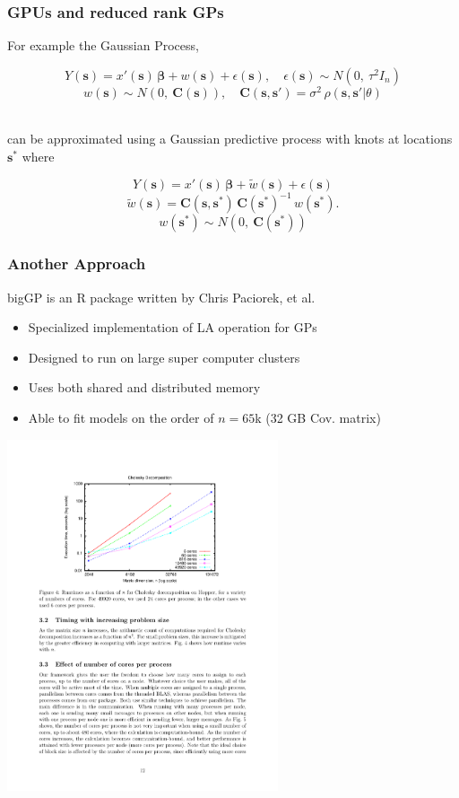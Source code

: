 \documentclass[t]{beamer}\usepackage[]{graphicx}\usepackage[]{color}
\begin{document}
\begin{frame}
\frametitle{GPUs and reduced rank GPs}
    
For example the Gaussian Process,

\[ Y(\bm{s}) = x'(\bm{s}) \, \bm{\beta} + w(\bm{s}) + \epsilon(\bm{s}), \quad \epsilon(\bm{s}) \sim N(0,~\tau^2I_n) \]
%
\[ w(\bm{s}) \sim N(0,~\bm{C}(\bm{s})), \quad \bm{C}(\bm{s},\bm{s}')=\sigma^2\,\rho(\bm{s},\bm{s}'|\theta) \]

~\\

can be approximated using a Gaussian predictive process with knots at locations $\bm{s}^*$ where

\[ Y(\bm{s}) = x'(\bm{s}) \, \bm{\beta} + \widetilde{w}(\bm{s}) + \epsilon(\bm{s}) \]
%
\[ \widetilde{w}(\bm{s}) = \bm{C}(\bm{s},\bm{s}^*) \, \bm{C}(\bm{s}^*)^{-1} \, w(\bm{s}^*). \]
%
\[ w(\bm{s}^*) \sim N(0,~\bm{C}(\bm{s}^*)) \]

\end{frame}


\begin{frame}
\frametitle{Another Approach}
  
bigGP is an R package written by Chris Paciorek, et al.

\begin{itemize}
\item Specialized implementation of LA operation for GPs
\item Designed to run on large super computer clusters
\item Uses both shared and distributed memory
\item Able to fit models on the order of $n = 65$k (32 GB Cov. matrix)
\end{itemize}


\begin{center}
\includegraphics[width=0.6\textwidth]{figs/Paciorek.pdf}
\end{center}

\end{frame}
\end{document}
